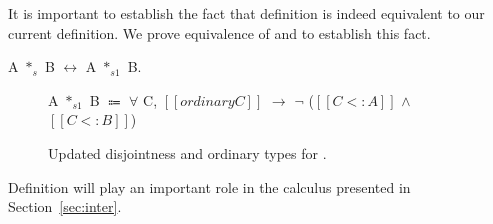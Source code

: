 It is important to establish the fact that definition
 is indeed equivalent to our current
definition. We prove equivalence of  and
 to establish this fact.

\begin{lemma}
A $*_{s}$ B $\longleftrightarrow$ A $*_{s1}$ B.
\end{lemma}

\begin{figure}
    \centering
  \medskip
  \begin{definition}
    \centering
    A $*_{s1}$ B $\Coloneqq$ $\forall$ C, $[[ordinary C]]$ $\rightarrow$ $\neg$ ($[[C <: A]]$ $\wedge$ $[[C <: B]]$)
    \label{def:union:disj1}
  \end{definition}
  \caption{Updated disjointness and ordinary types for \cal.
     }
  \label{fig:union:ord}
\end{figure}

Definition  will play an important role in the
calculus presented in Section~\ref{sec:inter}. 
